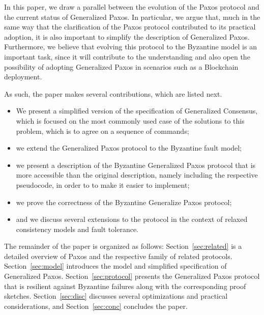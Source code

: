 
In this paper, we draw a parallel between the evolution of the Paxos
protocol and the current status of Generalized Paxos. In particular,
we argue that, much in the same way that the clarification of the Paxos
protocol contributed to its practical adoption, it is also important
to simplify the description of Generalized Paxos. Furthermore, we believe
that evolving this protocol to the Byzantine model is an important
task, since it will contribute to the understanding
and also open the possibility of adopting Generalized Paxos in
scenarios such as a Blockchain deployment.

As such, the paper makes several contributions, which are listed next.
%
\begin{itemize}
\item
We present a simplified version of the specification of Generalized
Consensus, which is focused on the most commonly used case of the
solutions to this problem, which is to agree on a sequence of
commands;

\item
we extend the Generalized Paxos protocol to the Byzantine fault model; 

\item
we present a description of the Byzantine Generalized Paxos protocol
that is more accessible than the original description, namely including the
respective pseudocode, in order to to make it 
easier to implement;

\item
we prove the correctness of the Byzantine Generalize Paxos protocol;

\item
and we discuss several extensions to the protocol in the context of relaxed consistency models and fault tolerance.
\end{itemize}
%
The remainder of the paper is organized as follows: 
Section~\ref{sec:related} is a detailed overview of Paxos and the respective family of related protocols.
Section~\ref{sec:model} introduces the model and simplified specification of Generalized Paxos.
Section~\ref{sec:protocol} presents the Generalized Paxos protocol that is resilient against Byzantine failures along with the corresponding proof sketches. 
Section~\ref{sec:disc} discusses several optimizations and practical considerations, and Section~\ref{sec:conc} concludes the paper.
%
